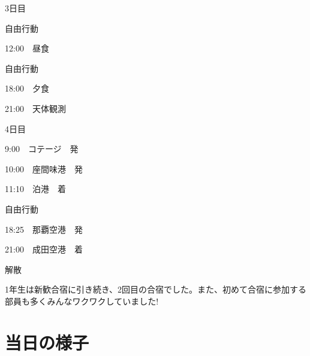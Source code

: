 \documentclass[../main]{subfiles}
\begin{document}
\begin{multicols}{2}
  \small
\begin{description}
    \item 3日目
    \begin{description}
        \item 自由行動
        \item 12:00　昼食
        \item 自由行動
        \item 18:00　夕食
        \item 21:00　天体観測
        \item
        \item
        \item
    \end{description}
    \item 4日目
    \begin{description}
        \item  9:00　コテージ　発
        \item 10:00　座間味港　発
        \item 11:10　泊港　着
        \item 自由行動
        \item 18:25　那覇空港　発
        \item 21:00　成田空港　着
        \item 解散
    \end{description}
\end{description}
\end{multicols}

1年生は新歓合宿に引き続き、2回目の合宿でした。また、初めて合宿に参加する部員も多くみんなワクワクしていました!
\\

\section{当日の様子}
\end{document}
